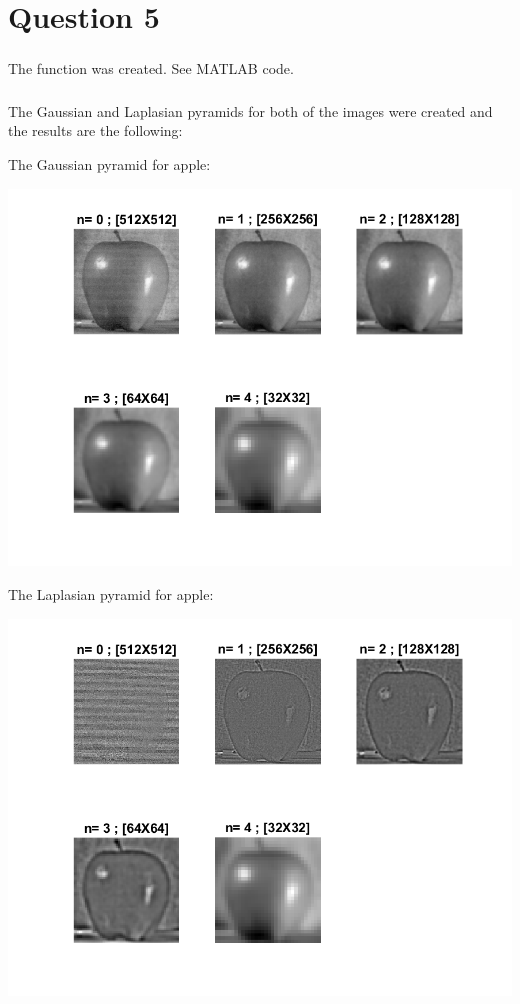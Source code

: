 \documentclass[a4paper]{iacas}
\begin{document}
\section{Question 5}

\subsubsection{}
The function was created. See MATLAB code.

\subsubsection{}
The Gaussian and Laplasian pyramids for both of the images were created and the results are the following:

The Gaussian pyramid for apple:
\vskip 0.1in
\begin{minipage}{1\textwidth}
\centering
	\includegraphics[scale=0.9]{../imgs/imgs_q5/q5_apple_gaus.png}
\end{minipage}
\vskip 0.1in

The Laplasian pyramid for apple:
\vskip 0.1in
\begin{minipage}{1\textwidth}
\centering
	\includegraphics[scale=0.9]{../imgs/imgs_q5/q5_apple_lap.png}
\end{minipage}
\vskip 0.1in
\end{document}
